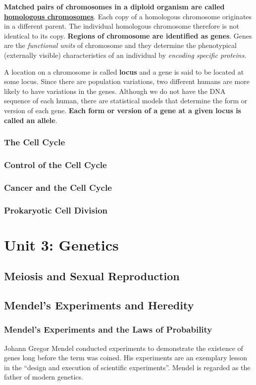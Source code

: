 \documentclass[12pt]{article}
\begin{document}
\textbf{Matched pairs of chromosomes in a diploid organism are called \underline{homologous chromosomes}}. Each copy of a homologous chromosome originates in a different parent. The individual homologous chromosome therefore is not identical to its copy. \textbf{Regions of chromosome are identified as genes}. Genes are the \emph{functional units} of chromosome and they determine the phenotypical (externally visible) characteristics of an individual by \emph{encoding specific proteins}. 

A location on a chromosome is called \textbf{locus} and a gene is said to be located at some locus. Since there are population variations, two different humans are more likely to have variations in the genes. Although we do not have the DNA sequence of each human, there are statistical models that determine the form or version of each gene. \textbf{Each form or version of a gene at a given locus is called an allele}.
\subsubsection{The Cell Cycle}
\subsubsection{Control of the Cell Cycle}
\subsubsection{Cancer and the Cell Cycle}
\subsubsection{Prokaryotic Cell Division}

\section{Unit 3: Genetics}
\subsection{Meiosis and Sexual Reproduction}
\subsection{Mendel's Experiments and Heredity}

\subsubsection{Mendel's Experiments and the Laws of Probability}
Johann Gregor Mendel conducted experiments to demonstrate the existence of genes long before the term was coined. His experiments are an exemplary lesson in the ``design and execution of scientific experiments''. Mendel is regarded as the father of modern genetics.
\end{document}
